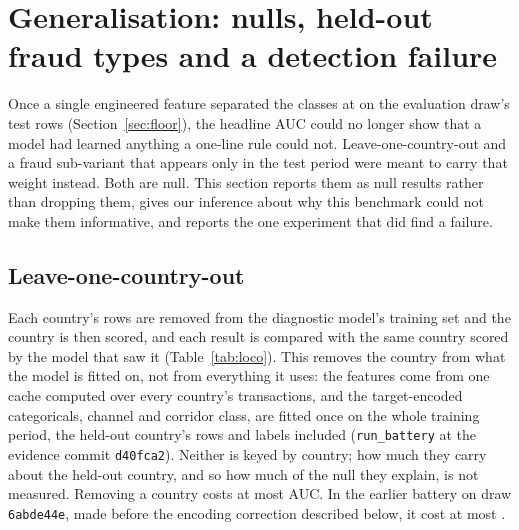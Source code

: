 \section{Generalisation: nulls, held-out fraud types and a detection failure}
\label{sec:generalisation}

Once a single engineered feature separated the classes at \nGateFloor{} on the evaluation draw's
test rows (Section~\ref{sec:floor}), the headline AUC could no longer show that a model had learned anything a
one-line rule could not.
Leave-one-country-out and a fraud sub-variant that appears only in the test period were meant to
carry that weight instead. Both are null. This section reports them as null results rather than
dropping them, gives our inference about why this benchmark could not make them informative, and
reports the one experiment that did find a failure.

\subsection{Leave-one-country-out}

Each country's rows are removed from the diagnostic model's training set and the country is then
scored, and each result is compared with the same country scored by the model that saw it
(Table~\ref{tab:loco}). This removes the country from what the model is fitted on, not from
everything it uses: the features come from one cache computed over every country's transactions,
and the target-encoded categoricals, channel and corridor class, are fitted once on the whole
training period, the held-out country's rows and labels included (\texttt{run\_battery} at the
evidence commit \texttt{d40fca2}). Neither is keyed by country; how much they carry about the
held-out country, and so how much of the null they explain, is not measured. Removing a country costs
at most \nLocoMaxLoss{} AUC. In the earlier battery on draw \texttt{6abde44e}, made before the
encoding correction described below, it cost at most \nEarlyLocoMaxLoss{}.

